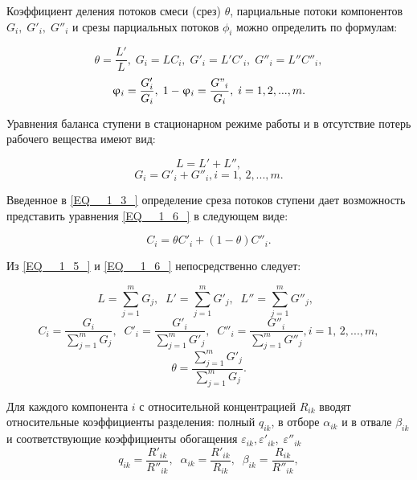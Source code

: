 Коэффициент деления потоков смеси (срез) $\theta$, парциальные потоки компонентов $G_{i} ,\; G'_{i} ,\; G''_{i}$ и срезы парциальных потоков $\phi _{i}$ можно определить по формулам:

\begin{equation} \label{EQ__1_3_} 
  \theta =\frac{L'}{L} ,\; G_{i} =LC_{i} ,\; G'_{i} =L'C'_{i} ,\; G''_{i} =L''C''_{i} , 
  \end{equation} 
  \begin{equation} \label{EQ__1_4_} 
  \phi _{i} =\frac{G'_{i} }{G_{i} } ,\; 1-\phi _{i} =\frac{G"_{i} }{G_{i} } ,\; i=1,2,...,m. 
  \end{equation} 

Уравнения баланса ступени в стационарном режиме работы и в отсутствие потерь рабочего вещества имеют вид:

\begin{equation} \label{EQ__1_5_} 
  L=L'+L'', 
  \end{equation} 
  \begin{equation} \label{EQ__1_6_} 
  G_{i} =G'_{i} +G''_{i} , i=1,\, 2,...,m.             
\end{equation} 
  

Введенное в \ref{EQ__1_3_} определение среза потоков ступени дает возможность представить уравнения \ref{EQ__1_6_} в следующем виде:

\begin{equation} \label{EQ__1_7_} 
  C_{i} =\theta C'_{i} +(1-\theta )C''_{i} . 
\end{equation} 

Из \ref{EQ__1_5_} и \ref{EQ__1_6_} непосредственно следует:

\begin{equation} \label{EQ__1_8_} 
  L=\sum _{j=1}^{m}G_{j}  ,\; \; L'=\sum _{j=1}^{m}G'_{j} ,\; \;  L''=\sum _{j=1}^{m}G''_{j} ,\; \;   
  \end{equation} 
  \begin{equation} \label{EQ__1_9_} 
  C_{i} =\frac{G_{i} }{\sum _{j=1}^{m}G_{j}  } ,\; \; C'_{i} =\frac{G'_{i} }{\sum _{j=1}^{m}G'_{j}  } ,\; \; C''_{i} =\frac{G''_{i} }{\sum _{j=1}^{m}G''_{j}  } , i=1,\, 2,...,m,             
  \end{equation} 
  \begin{equation} \label{EQ__1_10_} 
  \theta =\frac{\sum _{j=1}^{m}G'_{j}  }{\sum _{j=1}^{m}G_{j}  } .            
\end{equation} 

Для каждого компонента $i$ с относительной концентрацией $R_{ik}$ вводят относительные коэффициенты разделения: полный $q_{ik}$, в отборе $\alpha _{ik} $ и в отвале $\beta _{ik} $ и соответствующие коэффициенты обогащения $\varepsilon _{ik} ,\varepsilon '_{ik} ,\; \varepsilon ''_{ik} \; $
\[q_{ik} =\frac{R'_{ik} }{R''_{ik} } ,\; \; \alpha _{ik} =\frac{R'_{ik} }{R_{ik} } ,\; \; \beta _{ik} =\frac{R_{ik} }{R''_{ik} } ,\] 

